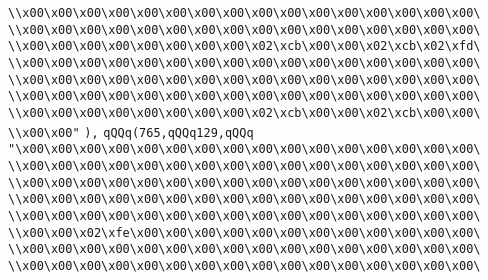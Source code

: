 \verb|\\x00\x00\x00\x00\x00\x00\x00\x00\x00\x00\x00\x00\x00\x00\x00\x00\|\newline
\verb|\\x00\x00\x00\x00\x00\x00\x00\x00\x00\x00\x00\x00\x00\x00\x00\x00\|\newline
\verb|\\x00\x00\x00\x00\x00\x00\x00\x00\x02\xcb\x00\x00\x02\xcb\x02\xfd\|\newline
\verb|\\x00\x00\x00\x00\x00\x00\x00\x00\x00\x00\x00\x00\x00\x00\x00\x00\|\newline
\verb|\\x00\x00\x00\x00\x00\x00\x00\x00\x00\x00\x00\x00\x00\x00\x00\x00\|\newline
\verb|\\x00\x00\x00\x00\x00\x00\x00\x00\x00\x00\x00\x00\x00\x00\x00\x00\|\newline
\verb|\\x00\x00\x00\x00\x00\x00\x00\x00\x02\xcb\x00\x00\x02\xcb\x00\x00\|\newline
\verb|\\x00\x00"|\newline
\verb|),|\newline
\verb|qQQq(765,qQQq129,qQQq|\newline
\verb|"\x00\x00\x00\x00\x00\x00\x00\x00\x00\x00\x00\x00\x00\x00\x00\x00\|\newline
\verb|\\x00\x00\x00\x00\x00\x00\x00\x00\x00\x00\x00\x00\x00\x00\x00\x00\|\newline
\verb|\\x00\x00\x00\x00\x00\x00\x00\x00\x00\x00\x00\x00\x00\x00\x00\x00\|\newline
\verb|\\x00\x00\x00\x00\x00\x00\x00\x00\x00\x00\x00\x00\x00\x00\x00\x00\|\newline
\verb|\\x00\x00\x00\x00\x00\x00\x00\x00\x00\x00\x00\x00\x00\x00\x00\x00\|\newline
\verb|\\x00\x00\x02\xfe\x00\x00\x00\x00\x00\x00\x00\x00\x00\x00\x00\x00\|\newline
\verb|\\x00\x00\x00\x00\x00\x00\x00\x00\x00\x00\x00\x00\x00\x00\x00\x00\|\newline
\verb|\\x00\x00\x00\x00\x00\x00\x00\x00\x00\x00\x00\x00\x00\x00\x00\x00\|\newline
